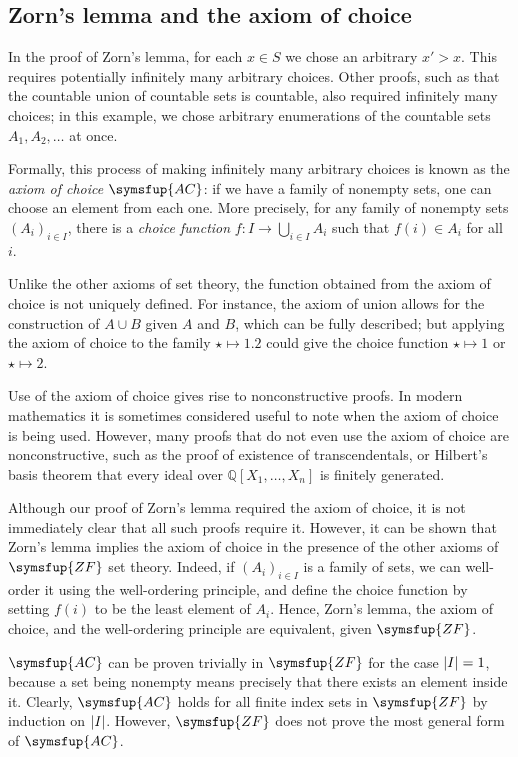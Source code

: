 \subsection{Zorn's lemma and the axiom of choice}
In the proof of Zorn's lemma, for each \( x \in S \) we chose an arbitrary \( x' > x \).
This requires potentially infinitely many arbitrary choices.
Other proofs, such as that the countable union of countable sets is countable, also required infinitely many choices; in this example, we chose arbitrary enumerations of the countable sets \( A_1, A_2, \dots \) at once.

Formally, this process of making infinitely many arbitrary choices is known as the \emph{axiom of choice} \( \symsfup{AC} \): if we have a family of nonempty sets, one can choose an element from each one.
More precisely, for any family of nonempty sets \( (A_i)_{i \in I} \), there is a \emph{choice function} \( f \colon I \to \bigcup_{i \in I} A_i \) such that \( f(i) \in A_i \) for all \( i \).

Unlike the other axioms of set theory, the function obtained from the axiom of choice is not uniquely defined.
For instance, the axiom of union allows for the construction of \( A \cup B \) given \( A \) and \( B \), which can be fully described; but applying the axiom of choice to the family \( \star \mapsto \qty{1, 2} \) could give the choice function \( \star \mapsto 1 \) or \( \star \mapsto 2 \).

Use of the axiom of choice gives rise to nonconstructive proofs.
In modern mathematics it is sometimes considered useful to note when the axiom of choice is being used.
However, many proofs that do not even use the axiom of choice are nonconstructive, such as the proof of existence of transcendentals, or Hilbert's basis theorem that every ideal over \( \mathbb Q[X_1, \dots, X_n] \) is finitely generated.

Although our proof of Zorn's lemma required the axiom of choice, it is not immediately clear that all such proofs require it.
However, it can be shown that Zorn's lemma implies the axiom of choice in the presence of the other axioms of \( \symsfup{ZF} \) set theory.
Indeed, if \( (A_i)_{i \in I} \) is a family of sets, we can well-order it using the well-ordering principle, and define the choice function by setting \( f(i) \) to be the least element of \( A_i \).
Hence, Zorn's lemma, the axiom of choice, and the well-ordering principle are equivalent, given \( \symsfup{ZF} \).

\( \symsfup{AC} \) can be proven trivially in \( \symsfup{ZF} \) for the case \( \abs{I} = 1 \), because a set being nonempty means precisely that there exists an element inside it.
Clearly, \( \symsfup{AC} \) holds for all finite index sets in \( \symsfup{ZF} \) by induction on \( \abs{I} \).
However, \( \symsfup{ZF} \) does not prove the most general form of \( \symsfup{AC} \).

